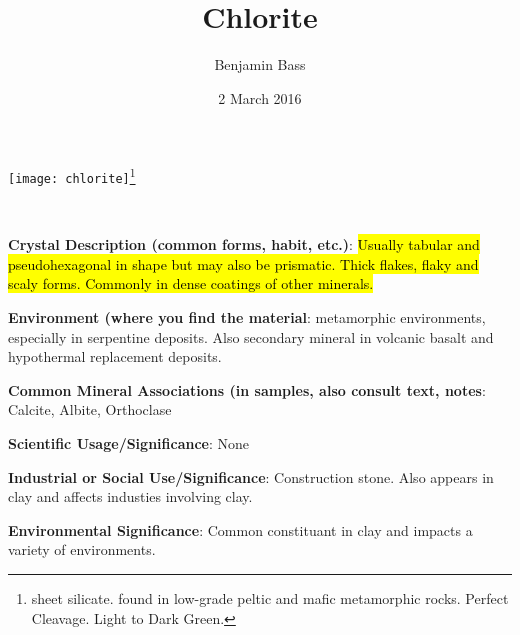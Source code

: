 \documentclass[10pt]{article}
\author{Benjamin Bass}
\date{2 March 2016}
\title{\vspace{-2.0cm}Chlorite} %
\begin{document}
\maketitle


\begin{center}
  \texttt{[image: chlorite]}\footnote{sheet silicate. found in low-grade peltic and mafic metamorphic rocks. Perfect Cleavage. Light to Dark Green.}
\end{center}



\
\
\
\
\
\
\
\
\
\

\begin{framed}
  \textbf{Crystal Description (common forms, habit, etc.)}: \hl{Usually tabular and pseudohexagonal in shape but may also be prismatic. Thick flakes, flaky and scaly forms. Commonly in dense coatings of other minerals.}
\end{framed}

\begin{framed}
  \textbf{Environment (where you find the material}: metamorphic environments, especially in serpentine deposits. Also secondary mineral in volcanic basalt and hypothermal replacement deposits.
\end{framed}

\begin{framed}
  \textbf{Common Mineral Associations (in samples, also consult text, notes}: Calcite, Albite, Orthoclase
\end{framed}

\begin{framed}
  \textbf{Scientific Usage/Significance}: None
\end{framed}

\begin{framed}
  \textbf{Industrial or Social Use/Significance}: Construction stone. Also appears in clay and affects industies involving clay.
\end{framed}

\begin{framed}
  \textbf{Environmental Significance}: Common constituant in clay and impacts a variety of environments.
\end{framed}

\end{document}
